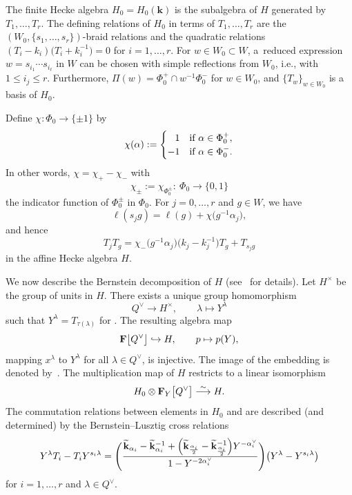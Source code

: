 \documentclass[11pt]{article}
\numberwithin{equation}{section}
\numberwithin{equation}{section}
\begin{document}
The finite Hecke algebra $H_0=H_0(\mathbf{k})$ is the subalgebra of $H$ generated by $T_1,\dots,T_r$. The defining relations of $H_0$ in terms of $T_1,\dots,T_r$
are the $(W_0,\{s_1,\dots,s_r\})$-braid relations and the quadratic relations $(T_i-k_i)\bigl(T_i+k_i^{-1}\bigr)=0$ for $i=1,\dots,r$.
For $w\in W_0\subset W$, a~reduced expression $w=s_{i_1}\cdots s_{i_\ell}$ in $W$ can be chosen with simple reflections from $W_0$, i.e., with $1\leq i_j\leq r$. Furthermore,
$\Pi(w)=\Phi_0^+\cap w^{-1}\Phi_0^-$ for $w\in W_0$, and $\{T_w\}_{w\in W_0}$ is a basis of $H_0$.

Define $\chi\colon \Phi_0\rightarrow \{\pm 1\}$ by
\begin{equation}\label{chi}
\chi(\alpha):=
\begin{cases}
\hphantom{-}1&\text{if}\ \alpha\in\Phi_0^{+},\\
-1&\text{if}\ \alpha\in\Phi_0^-.
\end{cases}
\end{equation}
In other words, $\chi=\chi_+-\chi_-$ with
\begin{equation*}%
\chi_{\pm}:=\chi_{\Phi_0^{\pm}}\colon\ \Phi_0\rightarrow \{0,1\}
\end{equation*}
the indicator function of $\Phi_0^{\pm}$ in $\Phi_0$.
For $j=0,\dots,r$ and $g\in W$, we have
\begin{equation*}%
\ell(s_jg)=\ell(g)+\chi\bigl(g^{-1}\alpha_j\bigr),
\end{equation*}
and hence
\begin{equation}\label{TjTw}
T_jT_g=\chi_-\bigl(g^{-1}\alpha_j\bigr)\bigl(k_j-k_j^{-1}\bigr)T_g+T_{s_jg}
\end{equation}
in the affine Hecke algebra $H$.

We now describe the Bernstein decomposition of $H$ (see~\cite{Lu} for details).
Let $H^\times$ be the group of units in $H$. There exists a unique group homomorphism
\[
Q^\vee\rightarrow H^\times,\qquad \lambda\mapsto Y^\lambda
\]
such that $Y^\lambda=T_{\tau(\lambda)}$ for .
The resulting algebra map
\begin{equation}\label{injY}
\mathbf{F}\smash{\bigl[Q^\vee\bigr]}\hookrightarrow H,\qquad p\mapsto p(Y),
\end{equation}
mapping $x^\lambda$ to $Y^\lambda$ for all $\lambda\in Q^\vee$, is injective. The image of the embedding is denoted by~.
The multiplication map of $H$ restricts to a linear isomorphism
\[
H_0\otimes\mathbf{F}_Y\smash{\bigl[Q^\vee\bigr]}\overset{\sim}{\longrightarrow} H.
\]
The commutation relations between elements in $H_0$ and  are described (and determined) by the {Bernstein--Lusztig} cross relations
\begin{equation}\label{crossY}
Y^\lambda T_i-T_i Y^{s_i\lambda}=\Biggl(\frac{\widetilde{\mathbf{k}}_{\alpha_i}-\widetilde{\mathbf{k}}_{\alpha_i}^{-1}+
\Bigl(\widetilde{\mathbf{k}}_{\frac{\alpha_i}{2}}-\widetilde{\mathbf{k}}_{\frac{\alpha_i}{2}}^{-1}\Bigr)Y^{-\alpha_i^\vee}}{1-Y^{-2\alpha_i^\vee}}\Biggr)\bigl(Y^\lambda-Y^{s_i\lambda}\bigr)
\end{equation}
for $i=1,\dots,r$ and $\lambda\in Q^\vee$.
\end{document}
